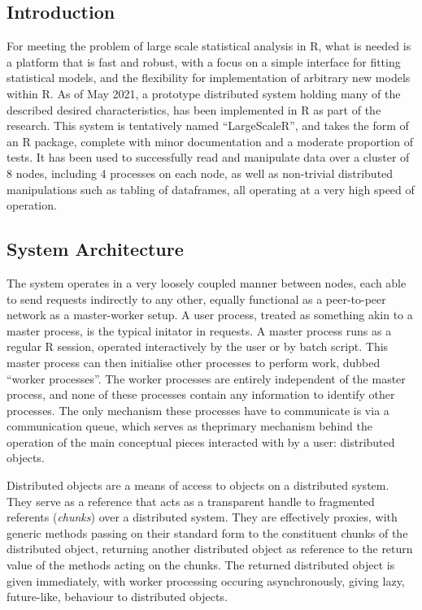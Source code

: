 \subsection{Introduction}

For meeting the problem of large scale statistical analysis in R, what is needed is a platform that is fast and robust, with a focus on a simple interface for fitting statistical models, and the flexibility for implementation of arbitrary new models within R.
As of May 2021, a prototype distributed system holding many of the described desired characteristics, has been implemented in R as part of the research.
This system is tentatively named ``LargeScaleR'', and takes the form of an R package, complete with minor documentation and a moderate proportion of tests.
It has been used to successfully read and manipulate data over a cluster of 8 nodes, including 4 processes on each node, as well as non-trivial distributed manipulations such as tabling of dataframes, all operating at a very high speed of operation.

\subsection{System Architecture}\label{sec:sys-imp}

The system operates in a very loosely coupled manner between nodes, each able to send requests indirectly to any other, equally functional as a peer-to-peer network as a master-worker setup.
A user process, treated as something akin to a master process, is the typical initator in requests. 
A master process runs as a regular R session, operated interactively by the user or by batch script.
This master process can then initialise other processes to perform work, dubbed ``worker processes''.
The worker processes are entirely independent of the master process, and none of these processes contain any information to identify other processes.
The only mechanism these processes have to communicate is via a communication queue, which serves as theprimary mechanism behind the operation of the main conceptual pieces interacted with by a user: distributed objects.

Distributed objects are a means of access to objects on a distributed system\cite{emmerich2000engineering}.
They serve as a reference that acts as a transparent handle to fragmented referents (\textit{chunks}) over a distributed system.
They are effectively proxies, with generic methods passing on their standard form to the constituent chunks of the distributed object, returning another distributed object as reference to the return value of the methods acting on the chunks.
The returned distributed object is given immediately, with worker processing occuring asynchronously, giving lazy, future-like, behaviour to distributed objects\cite{baker1977incremental}.


